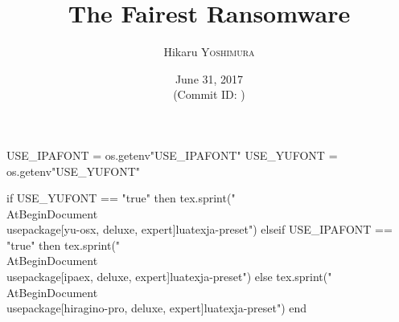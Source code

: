 \hypersetup{colorlinks,linkcolor=,urlcolor=links}

\beamertemplatenavigationsymbolsempty


\usepackage{luacode}
\usepackage{luatexja}
\usepackage{pgfpages}

\begin{luacode*}
  USE_IPAFONT = os.getenv"USE_IPAFONT"
  USE_YUFONT = os.getenv"USE_YUFONT"
  
  if USE_YUFONT == "true" then
    tex.sprint("\\AtBeginDocument{\\usepackage[yu-osx, deluxe, expert]{luatexja-preset}}")
  elseif USE_IPAFONT == "true" then
    tex.sprint("\\AtBeginDocument{\\usepackage[ipaex, deluxe, expert]{luatexja-preset}}")
  else
    tex.sprint("\\AtBeginDocument{\\usepackage[hiragino-pro, deluxe, expert]{luatexja-preset}}")
  end
\end{luacode*}

\usepackage{epigraph}
\usepackage{etoolbox}
\usepackage{tikz}
\usepackage{framed}
\usepackage{libertine}
\usepackage{amsmath}
\usepackage{mathtools}
\usepackage{listings}
\usepackage{tikz-qtree}

\renewcommand{\kanjifamilydefault}{\gtdefault}


\setmainfont[Ligatures=TeX]{Linux Libertine O}
\setsansfont[Ligatures=TeX]{CMU Sans Serif}
\setmonofont[Ligatures=TeX]{CMU Typewriter Text}



\title{The Fairest Ransomware}
\author[Hikaru YOSHIMURA]{%
  Hikaru \textsc{Yoshimura}
}
\date[June 31, 2017]{%
  June 31, 2017 \\%
  {\footnotesize (Commit ID: \GITAbrHash)}
}






\newcommand\ballref[1]{%
\tikz \node[circle, shade,ball color=structure.fg,inner sep=0pt,%
  text width=8pt,font=\tiny,align=center] {\color{white}\ref{#1}};
}



